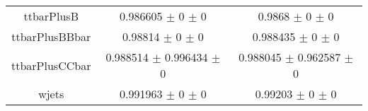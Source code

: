 \begin{table}
\begin{tabular}{ccc}
ttbarPlusB & \num{0.986605} $\pm$ \num{0} $\pm$ \num{0} & \num{0.9868} $\pm$ \num{0} $\pm$ \num{0}\\
ttbarPlusBBbar & \num{0.98814} $\pm$ \num{0} $\pm$ \num{0} & \num{0.988435} $\pm$ \num{0} $\pm$ \num{0}\\
ttbarPlusCCbar & \num{0.988514} $\pm$ \num{0.996434} $\pm$ \num{0} & \num{0.988045} $\pm$ \num{0.962587} $\pm$ \num{0}\\
wjets & \num{0.991963} $\pm$ \num{0} $\pm$ \num{0} & \num{0.99203} $\pm$ \num{0} $\pm$ \num{0}\\
\bottomrule
\end{tabular}
\end{table}
